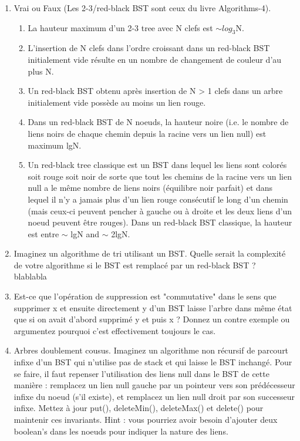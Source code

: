 \documentclass[11pt]{article}
\begin{document}
\begin{enumerate}
\begin{enumerate}
{\color{dkgreen}  }
\end{enumerate}

\item Vrai ou Faux (Les 2-3/red-black BST sont ceux du livre Algorithms-4).
\begin{enumerate}
\item La hauteur maximum d'un 2-3 tree avec N clefs est $\sim log_3$N.\\

{\color{dkgreen}  }

\item L'insertion de N clefs dans l'ordre croissant dans un red-black BST initialement
vide résulte en un nombre de changement de couleur d'au plus N.\\

\item Un red-black BST obtenu après insertion de N > 1 clefs dans un arbre initialement
vide possède au moins un lien rouge.\\

\item Dans un red-black BST de N noeuds, la hauteur noire (i.e. le nombre de liens
noirs de chaque chemin depuis la racine vers un lien null) est maximum lgN.\\

\item Un red-black tree classique est un BST dans lequel les liens sont colorés soit
rouge soit noir de sorte que tout les chemins de la racine vers un lien null a
le même nombre de liens noirs (équilibre noir parfait) et dans lequel il n'y
a jamais plus d'un lien rouge consécutif le long d'un chemin (mais ceux-ci
peuvent pencher à gauche ou à droite et les deux liens d'un noeud peuvent
être rouges). Dans un red-black BST classique, la hauteur est entre $\sim$ lgN
and $\sim$ 2lgN.
\end{enumerate}

\item Imaginez un algorithme de tri utilisant un BST. Quelle serait la complexité de
votre algorithme si le BST est remplacé par un red-black BST ? \\

blablabla
\item Est-ce que l’opération de suppression est "commutative" dans le sens que supprimer
x et ensuite directement y d’un BST laisse l’arbre dans même état que si on
avait d’abord supprimé y et puis x ? Donnez un contre exemple ou argumentez
pourquoi c’est effectivement toujours le cas.
\item Arbres doublement cousus. Imaginez un algorithme non récursif de parcourt infixe
d’un BST qui n’utilise pas de stack et qui laisse le BST inchangé. Pour se faire, il
faut repenser l’utilisation des liens null dans le BST de cette manière : remplacez
un lien null gauche par un pointeur vers son prédécesseur infixe du noeud
(s’il existe), et remplacez un lien null droit par son successeur infixe. Mettez
à jour put(), deleteMin(), deleteMax() et delete() pour maintenir
ces invariants. Hint : vous pourriez avoir besoin d’ajouter deux boolean’s dans
les noeuds pour indiquer la nature des liens.
\end{enumerate}
\end{document}

